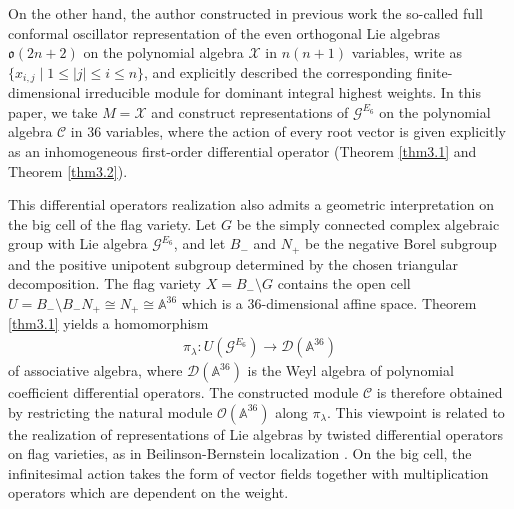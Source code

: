 \documentclass[12pt]{article}
\numberwithin{equation}{section}
\theoremstyle{definition}
\theoremstyle{remark}
\begin{document}
On the other hand, the author constructed in previous work \cite{Zhou} the so-called full conformal oscillator representation of the even orthogonal Lie algebras $\mathfrak{o}(2n+2)$ on the polynomial algebra $\mathscr{X}$ in $n(n+1)$ variables, write as $\{x_{i,j}\mid 1\leqslant |j|\leqslant i\leqslant n\}$, and explicitly described the corresponding finite-dimensional irreducible module for dominant integral highest weights. In this paper, we take $M=\mathscr{X}$ and construct representations of $\mathscr{G}^{E_6}$ on the polynomial algebra $\mathscr{C}$ in $36$ variables, where the action of every root vector is given explicitly as an inhomogeneous first-order differential operator (Theorem \ref{thm3.1} and Theorem \ref{thm3.2}). 

This differential operators realization also admits a geometric interpretation on the big cell of the flag variety. Let $G$ be the simply connected complex algebraic group with Lie algebra $\mathscr{G}^{E_6}$, and let $B_-$ and $N_+$ be the negative Borel subgroup and the positive unipotent subgroup determined by the chosen triangular decomposition. The flag variety $X=B_-\setminus G$ contains the open cell $U=B_-\setminus B_-N_+\cong N_+\cong \mathbb{A}^{36}$ which is a $36$-dimensional affine space. Theorem \ref{thm3.1} yields a homomorphism
\begin{align}
    \pi_{\lambda}:U(\mathscr{G}^{E_6})\longrightarrow \mathscr{D}(\mathbb{A}^{36})
\end{align}
of associative algebra, where $\mathscr{D}(\mathbb{A}^{36})$ is the Weyl algebra of polynomial coefficient differential operators. The constructed module $\mathscr{C}$ is therefore obtained by restricting the natural module $\mathscr{O}(\mathbb{A}^{36})$ along $\pi_{\lambda}$. This viewpoint is related to the realization of representations of Lie algebras by twisted differential operators on flag varieties, as in Beilinson-Bernstein localization \cite{BB}. On the big cell, the infinitesimal action takes the form of vector fields together with multiplication operators which are dependent on the weight.
\end{document}
